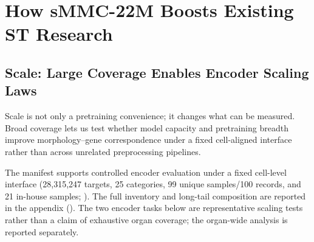 \documentclass[sigconf,review]{acmart}
\newcommand{\dataset}{sMMC-22M\xspace}
\newcommand{\benchmarkname}{sMMC-22M Bench\xspace}
\begin{document}



\section{How \dataset Boosts Existing ST Research}
\subsection{Scale: Large Coverage Enables Encoder Scaling Laws}
Scale is not only a pretraining convenience; it changes what can be measured.
Broad coverage lets us test whether model capacity and pretraining breadth
improve morphology--gene correspondence under a fixed cell-aligned interface
rather than across unrelated preprocessing pipelines.

The manifest supports controlled encoder evaluation under a fixed cell-level
interface (28{,}315{,}247 targets, 25 categories, 99 unique samples/100
records, and 21 in-house samples; ). The full
inventory and long-tail composition are reported in the appendix
().
The two encoder tasks below are representative scaling tests rather than a
claim of exhaustive organ coverage; the organ-wide analysis is reported
separately.
\end{document}
